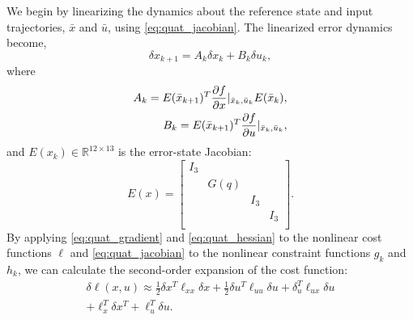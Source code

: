 \documentclass[letterpaper, 10 pt, conference]{ieeeconf}  %
\newcommand{\half}{\frac{1}{2}}
\newcommand{\R}{\mathbb{R}}
\newcommand{\todo}[1]{\textcolor{red}{TODO: #1}}
\begin{document}
    We begin by linearizing the dynamics about the reference state and input trajectories, $\bar{x}$ and $\bar{u}$, using
    \eqref{eq:quat_jacobian}. The linearized error dynamics become,
    \begin{equation} \label{eq:linearized_dynamics}
        \delta x_{k+1} = A_k \delta x_k + B_k \delta u_k ,
    \end{equation}
    where \begin{equation}
        \begin{aligned}
            A_k = E(\bar{x}_{k+1})^T \pdv{f}{x}|_{\bar{x}_k,\bar{u}_k} E(\bar{x}_k), \\
            B_k = E(\bar{x}_{k+1})^T \pdv{f}{u}|_{\bar{x}_k,\bar{u}_k},
        \end{aligned}
    \end{equation}
    and $E(x_k) \in \R^{12 \times 13}$ is the error-state Jacobian:
    \begin{equation} \label{eq:state_error_jacobian}
        E(x) = \begin{bmatrix}
            I_3 & & & \\
            & G(q) & & \\
            & & I_3 & \\
            & & & I_3 \\
        \end{bmatrix}\!.
    \end{equation}
    By applying \eqref{eq:quat_gradient} and \eqref{eq:quat_hessian} to the nonlinear
    cost functions $\ell$ and \eqref{eq:quat_jacobian} to the nonlinear constraint
    functions $g_k$ and $h_k$, we can calculate the second-order expansion of the cost 
    function:
    \begin{multline}
        \delta \ell(x,u) \approx  \half \delta x^T \ell_{xx} \delta x
            + \half \delta u^T \ell_{uu} \delta u + \delta_u^T \ell_{ux} \delta u \\
            + \ell_x^T \delta x^T + \ell_u^T \delta u.
    \end{multline}
	
\end{document}
